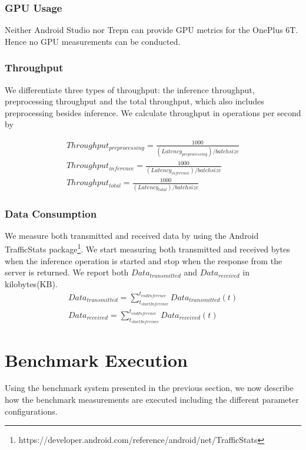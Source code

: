 \subsubsection{GPU Usage}
Neither Android Studio nor Trepn can provide GPU metrics for the OnePlus 6T. Hence no GPU measurements can be conducted.
\subsubsection{Throughput}
We differentiate three types of throughput: the inference throughput, preprocessing throughput and the total throughput, which also includes preprocessing besides inference.
We calculate throughput in operations per second by 

\begin{equation*}
\begin{gathered}
Throughput_{preprocessing} =\frac{1000}{(Latency_{preprocessing}) / batchsize}\\
Throughput_{inference} =\frac{1000}{(Latency_{inference}) / batchsize}\\
Throughput_{total}  =\frac{1000}{(Latency_{total}) / batchsize}
\end{gathered}
\end{equation*}
\subsubsection{Data Consumption}
We measure both transmitted and received data by using the Android TrafficStats package\footnote{https://developer.android.com/reference/android/net/TrafficStats}. We start measuring both transmitted and received bytes when the inference operation is started and stop when the response from the server is returned. We report both $Data_{transmitted}$ and $Data_{received}$ in kilobytes(KB).
\begin{equation*}
\begin{gathered}
Data_{transmitted} = \sum_{t_{startInference}}^{t_{endInference}} Data_{transmitted}(t)\\
Data_{received} = \sum_{t_{startInference}}^{t_{endInference}} Data_{received}(t)
\end{gathered}
\end{equation*}

\section{Benchmark Execution}
\label{chap:benchmarkExec}
Using the benchmark system presented in the previous section, we now describe how the benchmark measurements are executed including the different parameter configurations.



